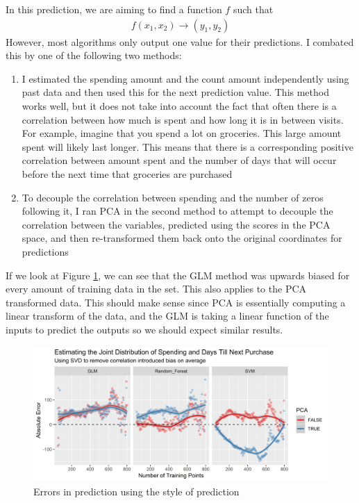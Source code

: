 \documentclass[11pt,a4paper]{article}
\begin{document}
In this prediction, we are aiming to find a function $f$ such that 
\begin{align*}
f(x_1, x_2) \rightarrow (y_1, y_2)
\end{align*}
However, most algorithms only output one value for their predictions. I combated this by one of the following two methods:
\begin{enumerate}
	\item I estimated the spending amount and the count amount independently using past data and then used this for the next prediction value. This method works well, but it does not take into account the fact that often there is a correlation between how much is spent and how long it is in between visits. For example, imagine that you spend a lot on groceries. This large amount spent will likely last longer. This means that there is a corresponding positive correlation between amount spent and the number of days that will occur before the next time that groceries are purchased
	\item To decouple the correlation between spending and the number of zeros following it, I ran PCA in the second method to attempt to decouple the correlation between the variables, predicted using the scores in the PCA space, and then re-transformed them back onto the original coordinates for predictions
\end{enumerate}

If we look at Figure \ref{fig:07yinyangmultiple}, we can see that the GLM method was upwards biased for every amount of training data in the set. This also applies to the PCA transformed \yinyang data. This should make sense since PCA is essentially computing a linear transform of the data, and the GLM is taking a linear function of the inputs to predict the outputs so we should expect similar results. 

\begin{figure}
	\centering
	\includegraphics[width=1\linewidth]{../figures/07_yin_yang_multiple}
	\caption{Errors in prediction using the \yinyang style of prediction}
	\label{fig:07yinyangmultiple}
\end{figure}
\end{document}
